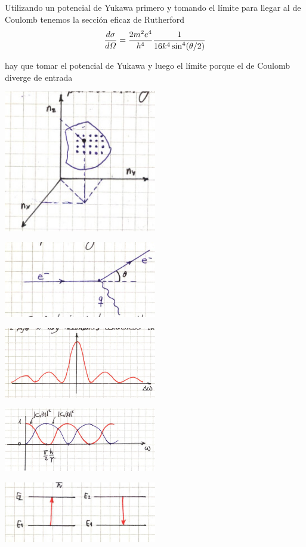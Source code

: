 \documentclass[10pt,oneside]{CBFT_book}
\begin{document}
Utilizando un potencial de Yukawa primero y tomando el límite para llegar al de Coulomb tenemos la sección 
eficaz de Rutherford 
\[
	\frac{d^{\hspace{-0.05em}} {\sigma}}{d {\Omega}^{\hspace{-0.05em}}} = \frac{2m^2e^4}{\hbar^4}\frac{1}{16k^4\sin^4(\theta/2)}
\]

hay que tomar el potencial de Yukawa y luego el límite porque el de Coulomb diverge de entrada

	\includegraphics[width=0.5\textwidth]{images/fig_ft2_scattering_section_2.jpg}
	
	\includegraphics[width=0.5\textwidth]{images/fig_ft2_scattering_section_3.jpg}
		
	\includegraphics[width=0.5\textwidth]{images/fig_ft2_scattering_section_p1.jpg}
	
	\includegraphics[width=0.5\textwidth]{images/fig_ft2_scattering_section_p2.jpg}
	
	\includegraphics[width=0.5\textwidth]{images/fig_ft2_scattering_section_p3.jpg}



\end{document}
